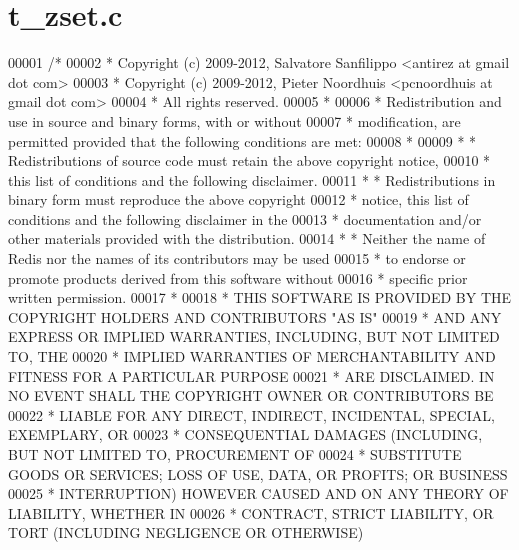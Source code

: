 \hypertarget{t__zset_8c_source}{}\section{t\+\_\+zset.\+c}
\label{t__zset_8c_source}

\begin{DoxyCode}
00001 \textcolor{comment}{/*}
00002 \textcolor{comment}{ * Copyright (c) 2009-2012, Salvatore Sanfilippo <antirez at gmail dot com>}
00003 \textcolor{comment}{ * Copyright (c) 2009-2012, Pieter Noordhuis <pcnoordhuis at gmail dot com>}
00004 \textcolor{comment}{ * All rights reserved.}
00005 \textcolor{comment}{ *}
00006 \textcolor{comment}{ * Redistribution and use in source and binary forms, with or without}
00007 \textcolor{comment}{ * modification, are permitted provided that the following conditions are met:}
00008 \textcolor{comment}{ *}
00009 \textcolor{comment}{ *   * Redistributions of source code must retain the above copyright notice,}
00010 \textcolor{comment}{ *     this list of conditions and the following disclaimer.}
00011 \textcolor{comment}{ *   * Redistributions in binary form must reproduce the above copyright}
00012 \textcolor{comment}{ *     notice, this list of conditions and the following disclaimer in the}
00013 \textcolor{comment}{ *     documentation and/or other materials provided with the distribution.}
00014 \textcolor{comment}{ *   * Neither the name of Redis nor the names of its contributors may be used}
00015 \textcolor{comment}{ *     to endorse or promote products derived from this software without}
00016 \textcolor{comment}{ *     specific prior written permission.}
00017 \textcolor{comment}{ *}
00018 \textcolor{comment}{ * THIS SOFTWARE IS PROVIDED BY THE COPYRIGHT HOLDERS AND CONTRIBUTORS "AS IS"}
00019 \textcolor{comment}{ * AND ANY EXPRESS OR IMPLIED WARRANTIES, INCLUDING, BUT NOT LIMITED TO, THE}
00020 \textcolor{comment}{ * IMPLIED WARRANTIES OF MERCHANTABILITY AND FITNESS FOR A PARTICULAR PURPOSE}
00021 \textcolor{comment}{ * ARE DISCLAIMED. IN NO EVENT SHALL THE COPYRIGHT OWNER OR CONTRIBUTORS BE}
00022 \textcolor{comment}{ * LIABLE FOR ANY DIRECT, INDIRECT, INCIDENTAL, SPECIAL, EXEMPLARY, OR}
00023 \textcolor{comment}{ * CONSEQUENTIAL DAMAGES (INCLUDING, BUT NOT LIMITED TO, PROCUREMENT OF}
00024 \textcolor{comment}{ * SUBSTITUTE GOODS OR SERVICES; LOSS OF USE, DATA, OR PROFITS; OR BUSINESS}
00025 \textcolor{comment}{ * INTERRUPTION) HOWEVER CAUSED AND ON ANY THEORY OF LIABILITY, WHETHER IN}
00026 \textcolor{comment}{ * CONTRACT, STRICT LIABILITY, OR TORT (INCLUDING NEGLIGENCE OR OTHERWISE)}

\end{DoxyCode}
